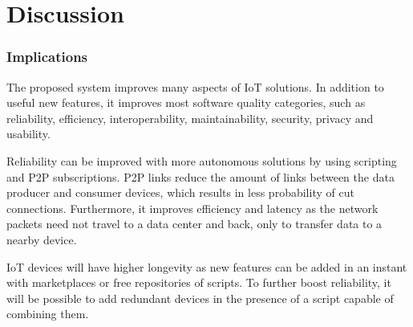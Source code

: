 \chapter{Discussion}
\label{chapter:discussion}





\subsection*{Implications}


The proposed system improves many aspects of IoT solutions. In addition to useful new features, it improves most software quality categories, such as reliability, efficiency, interoperability, maintainability, security, privacy and usability.

Reliability can be improved with more autonomous solutions by using scripting and P2P subscriptions. P2P links reduce the amount of links between the data producer and consumer devices, which results in less probability of cut connections. Furthermore, it improves efficiency and latency as the network packets need not travel to a data center and back, only to transfer data to a nearby device.

IoT devices will have higher longevity as new features can be added in an instant with marketplaces or free repositories of scripts. To further boost reliability, it will be possible to add redundant devices in the presence of a script capable of combining them. 

